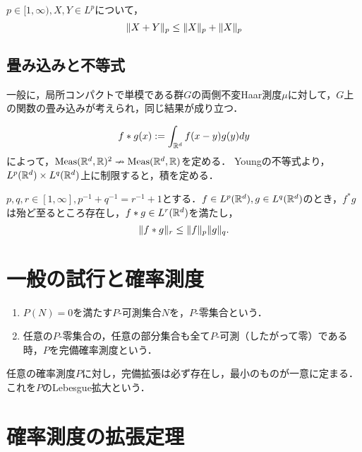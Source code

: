 \documentclass[uplatex,dvipdfmx]{jsreport}
\begin{document}
\begin{proposition}[Minkowski]
    $p\in[1,\infty),X,Y\in L^p$について，
    \[\|X+Y\|_p\le\|X\|_p+\|X\|_p\]
\end{proposition}

\subsection{畳み込みと不等式}

\begin{notation}
    一般に，局所コンパクトで単模である群$G$の両側不変Haar測度$\mu$に対して，$G$上の関数の畳み込みが考えられ，同じ結果が成り立つ．
\end{notation}

\begin{definition}
    \[f*g(x):=\int_{\mathbb{R}^d}f(x-y)g(y)dy\]
    によって，$\mathrm{Meas}(\mathbb{R}^d,\mathbb{R})^2\nrightarrow\mathrm{Meas}(\mathbb{R}^d,\mathbb{R})$を定める．
    Youngの不等式より，$L^p(\mathbb{R}^d)\times L^q(\mathbb{R}^d)$上に制限すると，積を定める．
\end{definition}

\begin{proposition}[Young]
    $p,q,r\in[1,\infty],p^{-1}+q^{-1}=r^{-1}+1$とする．$f\in L^p(\mathbb{R}^d),g\in L^q(\mathbb{R}^d)$のとき，$f^*g$は殆ど至るところ存在し，$f*g\in L^r(\mathbb{R}^d)$を満たし，
    \[\|f*g\|_r\le\|f\|_p\|g\|_q.\]
\end{proposition}

\section{一般の試行と確率測度}

\begin{definition}\mbox{}\label{def-complete-measure}
    \begin{enumerate}
        \item $P(N)=0$を満たす$P$-可測集合$N$を，$P$-零集合という．
        \item 任意の$P$-零集合の，任意の部分集合も全て$P$-可測（したがって零）である時，$P$を完備確率測度という．
    \end{enumerate}
\end{definition}

\begin{proposition}
    任意の確率測度$P$に対し，完備拡張は必ず存在し，最小のものが一意に定まる．これを$P$のLebesgue拡大という．
\end{proposition}

\section{確率測度の拡張定理}
\end{document}
